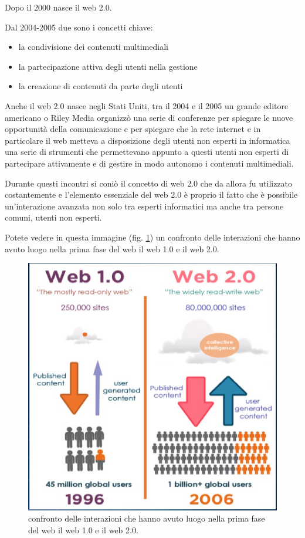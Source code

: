 Dopo il 2000 nasce il web 2.0.

Dal 2004-2005 due sono i concetti chiave:

\begin{itemize}
    \item la condivisione dei contenuti multimediali
    \item la partecipazione attiva degli utenti nella gestione
    \item la creazione di contenuti da parte degli utenti
\end{itemize}

Anche il web 2.0 nasce negli Stati Uniti, tra il 2004 e il 2005 un grande editore americano o Riley Media organizzò una serie di conferenze per spiegare le nuove opportunità della comunicazione e per spiegare che la rete internet e in particolare il web metteva a disposizione degli utenti non esperti in informatica una serie di strumenti che permettevano appunto a questi utenti non esperti di partecipare attivamente e di gestire in modo autonomo i contenuti multimediali. 

Durante questi incontri si coniò il concetto di web 2.0 che da allora fu utilizzato costantemente e l'elemento essenziale del web 2.0 è proprio il fatto che è possibile un'interazione avanzata non solo tra esperti informatici ma anche tra persone comuni, utenti non esperti. 

Potete vedere in questa immagine (fig. \ref{fig: web1_0_web_2_0}) un confronto delle interazioni che hanno avuto luogo nella prima fase del web il web 1.0 e il web 2.0.

\begin{figure}[ht]
    \centering
    \includegraphics[width=0.75\linewidth]{images/06_lez_fig_01.jpg}
    \caption{confronto delle interazioni che hanno avuto luogo nella prima fase del web il web 1.0 e il web 2.0.}
    \label{fig: web1_0_web_2_0}
\end{figure}

